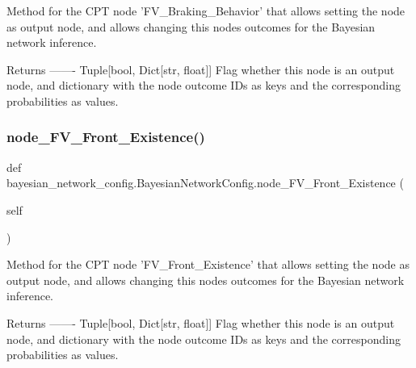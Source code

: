 \begin{DoxyVerb}Method for the CPT node 'FV_Braking_Behavior' that allows setting the node as output node,
and allows changing this nodes outcomes for the Bayesian network inference.

Returns
-------
Tuple[bool, Dict[str, float]]
    Flag whether this node is an output node, and dictionary with the node outcome IDs as keys
    and the corresponding probabilities as values.
\end{DoxyVerb}
 \mbox{\label{classbayesian__network__config_1_1_bayesian_network_config_afe1f290bda7493ebf0098c0c69ec267b}} 
\subsubsection{\texorpdfstring{node\+\_\+\+F\+V\+\_\+\+Front\+\_\+\+Existence()}{node\_FV\_Front\_Existence()}}
{\footnotesize\ttfamily def bayesian\+\_\+network\+\_\+config.\+Bayesian\+Network\+Config.\+node\+\_\+\+F\+V\+\_\+\+Front\+\_\+\+Existence (\begin{DoxyParamCaption}\item[{}]{self }\end{DoxyParamCaption})}

\begin{DoxyVerb}Method for the CPT node 'FV_Front_Existence' that allows setting the node as output node,
and allows changing this nodes outcomes for the Bayesian network inference.

Returns
-------
Tuple[bool, Dict[str, float]]
    Flag whether this node is an output node, and dictionary with the node outcome IDs as keys
    and the corresponding probabilities as values.
\end{DoxyVerb}
 \mbox{\label{classbayesian__network__config_1_1_bayesian_network_config_aa63fd1483c8ff02d6bc7c9482a59cad5}} 
